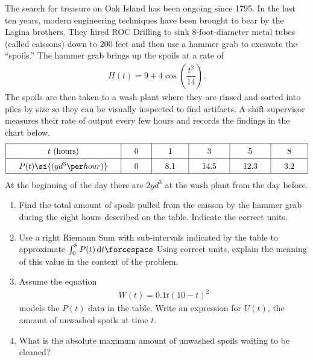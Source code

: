 The search for treasure on Oak Island has been ongoing since 1795. In the last ten years, modern engineering techniques have been brought to bear by the Lagina brothers. They hired ROC Drilling to sink $8$-foot-diameter metal tubes (called caissons) down to $200$ feet and then use a hammer grab to excavate the ``spoils.'' The hammer grab brings up the spoils at a rate of \begin{align*}
    H(t) = 9 + 4\cos \left(\dfrac{t^2}{14}\right).
\end{align*}
The spoils are then taken to a wash plant where they are rinsed and sorted into piles by size so they can be visually inspected to find artifacts. A shift supervisor measures their rate of output every few hours and records the findings in the chart below. \begin{align*}
    \arraycolsep=16.5pt\def\arraystretch{1.5}
    \begin{array}{|c|c|c|c|c|c|}
        \hline
        t \text{ (hours)} & 0 & 1 & 3 & 5 & 8 \\ \hline
        P(t) \si{(yd^3 \per hour)} & 0 & 8.1 & 14.5 & 12.3 & 3.2 \\
        \hline 
    \end{array}
\end{align*}
At the beginning of the day there are $2 \si{yd^3}$ at the wash plant from the day before. \\
\begin{enumerate}[label=\hspace{11pt}(\alph*), align=left, leftmargin=*, labelsep=0.25em]
    \item Find the total amount of spoils pulled from the caisson by the hammer grab during the eight hours described on the table. Indicate the correct units. 
    \item Use a right Riemann Sum with sub-intervals indicated by the table to approximate $\int_0^8 P(t) \,\mathrm{d}t \forcespace$ Using correct units, explain the meaning of this value in the context of the problem.
    \item Assume the equation \begin{align*}
        W(t) = 0.1t(10 - t)^2
    \end{align*}
    models the $P(t)$ data in the table. Write an expression for $U(t)$, the amount of unwashed spoils at time $t$.
    \item What is the absolute maximum amount of unwashed spoils waiting to be cleaned?
\end{enumerate} \vspace{11pt}

